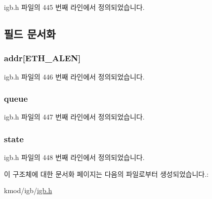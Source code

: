 igb.\+h 파일의 445 번째 라인에서 정의되었습니다.



\subsection{필드 문서화}
\subsubsection[{\texorpdfstring{addr}{addr}}]{ addr\mbox{[}{\bf E\+T\+H\+\_\+\+A\+L\+EN}\mbox{]}}\hypertarget{structigb__mac__addr_ad0cb1fd890c452cd6b53222cc82474a4}{}\label{structigb__mac__addr_ad0cb1fd890c452cd6b53222cc82474a4}


igb.\+h 파일의 446 번째 라인에서 정의되었습니다.

\subsubsection[{\texorpdfstring{queue}{queue}}]{ queue}\hypertarget{structigb__mac__addr_a4895577ef36597501c4510a0ff6cea06}{}\label{structigb__mac__addr_a4895577ef36597501c4510a0ff6cea06}


igb.\+h 파일의 447 번째 라인에서 정의되었습니다.

\subsubsection[{\texorpdfstring{state}{state}}]{ state}\hypertarget{structigb__mac__addr_a070982b79bdea9f300a85500230fa22c}{}\label{structigb__mac__addr_a070982b79bdea9f300a85500230fa22c}


igb.\+h 파일의 448 번째 라인에서 정의되었습니다.



이 구조체에 대한 문서화 페이지는 다음의 파일로부터 생성되었습니다.\+:\begin{DoxyCompactItemize}
\item 
kmod/igb/\hyperlink{kmod_2igb_2igb_8h}{igb.\+h}\end{DoxyCompactItemize}
